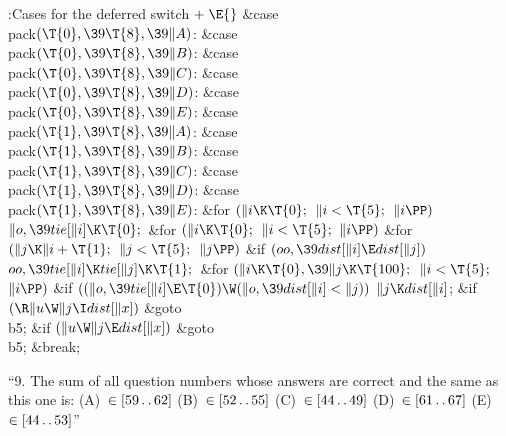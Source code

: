 \B{}:Cases for the deferred switch\X${}\mathrel+\E{}$\6
\4\&{case} \\{pack}${}(\T{0},\39\T{8},\39\|A){}$:\5
\&{case} \\{pack}${}(\T{0},\39\T{8},\39\|B){}$:\5
\&{case} \\{pack}${}(\T{0},\39\T{8},\39\|C){}$:\5
\&{case} \\{pack}${}(\T{0},\39\T{8},\39\|D){}$:\5
\&{case} \\{pack}${}(\T{0},\39\T{8},\39\|E){}$:\5
\&{case} \\{pack}${}(\T{1},\39\T{8},\39\|A){}$:\5
\&{case} \\{pack}${}(\T{1},\39\T{8},\39\|B){}$:\5
\&{case} \\{pack}${}(\T{1},\39\T{8},\39\|C){}$:\5
\&{case} \\{pack}${}(\T{1},\39\T{8},\39\|D){}$:\5
\&{case} \\{pack}${}(\T{1},\39\T{8},\39\|E){}$:\5
\&{for} ${}(\|i\K\T{0};{}$ ${}\|i<\T{5};{}$ ${}\|i\PP){}$\1\5
${}\|o,\39\\{tie}[\|i]\K\T{0};{}$\2\6
\&{for} ${}(\|i\K\T{0};{}$ ${}\|i<\T{5};{}$ ${}\|i\PP){}$\1\6
\&{for} ${}(\|j\K\|i+\T{1};{}$ ${}\|j<\T{5};{}$ ${}\|j\PP){}$\1\6
\&{if} ${}(\\{oo},\39\\{dist}[\|i]\E\\{dist}[\|j]){}$\1\5
${}\\{oo},\39\\{tie}[\|i]\K\\{tie}[\|j]\K\T{1};{}$\2\2\2\6
\&{for} ${}(\|i\K\T{0},\39\|j\K\T{100};{}$ ${}\|i<\T{5};{}$ ${}\|i\PP){}$\1\6
\&{if} ${}((\|o,\39\\{tie}[\|i]\E\T{0})\W(\|o,\39\\{dist}[\|i]<\|j)){}$\1\5
${}\|j\K\\{dist}[\|i]{}$;\2\2\6
\&{if} ${}(\R\|u\W\|j\I\\{dist}[\|x]){}$\1\5
\&{goto} \\{b5};\2\6
\&{if} ${}(\|u\W\|j\E\\{dist}[\|x]){}$\1\5
\&{goto} \\{b5};\5
\2\&{break};\par
\fi

``9. The sum of all question numbers whose answers are correct and the
same as
this one is:
(A)~$\in[59\mathinner{\ldotp\ldotp}62]$ (B)~$\in[52\mathinner{\ldotp\ldotp}55]$ (C)~$\in[44\mathinner{\ldotp\ldotp}49]$
(D)~$\in[61\mathinner{\ldotp\ldotp}67]$ (E)~$\in[44\mathinner{\ldotp\ldotp}53]$''

